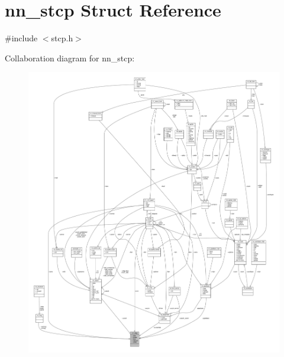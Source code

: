 \hypertarget{structnn__stcp}{}\section{nn\+\_\+stcp Struct Reference}
\label{structnn__stcp}


{\ttfamily \#include $<$stcp.\+h$>$}



Collaboration diagram for nn\+\_\+stcp\+:\nopagebreak
\begin{figure}[H]
\begin{center}
\leavevmode
\includegraphics[width=350pt]{structnn__stcp__coll__graph}
\end{center}
\end{figure}
